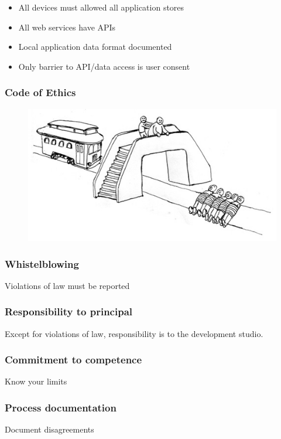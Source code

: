 \begin{itemize}
\item All devices must allowed all application stores
\item All web services have APIs
\item Local application data format documented
\item Only barrier to API/data access is user consent
\end{itemize}

\begin{frame}[fragile]
\frametitle{Code of Ethics}

\begin{figure}
\includegraphics{fat}
\end{figure}

\end{frame}


\begin{frame}[fragile]
\frametitle{Whistelblowing}

Violations of law must be reported

\end{frame}

\begin{frame}[fragile]
\frametitle{Responsibility to principal}

Except for violations of law,
responsibility is to the development studio.

\end{frame}

\begin{frame}[fragile]
\frametitle{Commitment to competence}

Know your limits

\end{frame}

\begin{frame}[fragile]
\frametitle{Process documentation}

Document disagreements

\end{frame}

